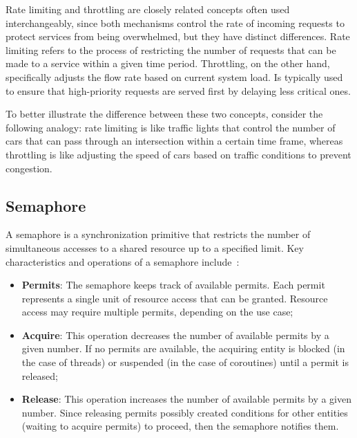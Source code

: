 Rate limiting and throttling are closely related concepts often used interchangeably,
since both mechanisms control the rate of incoming requests to protect services from being overwhelmed, but they have distinct differences.
Rate limiting refers to the process of restricting the number of requests that can be made to a service within a given time period.
Throttling, on the other hand,
specifically adjusts the flow rate based on current system load.
Is typically used to ensure that high-priority requests are served first by delaying less critical ones.

To better illustrate the difference between these two concepts, consider the following analogy: rate limiting is like traffic lights that control the number of cars that can pass through an intersection within a certain time frame,
whereas throttling is like adjusting the speed of cars based on traffic conditions to prevent congestion.

\subsection{Semaphore}\label{subsec:rate-limiter-semaphore}

A semaphore is a synchronization primitive that restricts the number of simultaneous accesses to a shared resource
up to a specified limit.
Key characteristics and operations of a semaphore include~\cite{java-semaphore, oracle-multithreaded-programming-guide}:

\begin{itemize}
    \item \textbf{Permits}: The semaphore keeps track of available permits.
    Each permit represents a single unit of resource access that can be granted.
    Resource access may require multiple permits, depending on the use case;
    \item \textbf{Acquire}: This operation decreases the number of available permits by a given number.
    If no permits are available, the acquiring entity is blocked (in the case of threads) or suspended (in the case of coroutines) until a permit is released;
    \item \textbf{Release}: This operation increases the number of available permits by a given number.
    Since releasing permits possibly created conditions for other entities (waiting to acquire permits) to proceed, then the semaphore notifies them.
\end{itemize}

